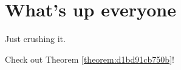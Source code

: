 \documentclass[reqno]{amsart} 
\begin{document}
\section{What's up everyone}
Just crushing it.

Check out Theorem \ref{theorem:d1bd91cb750b}!

{} 
\end{document}

